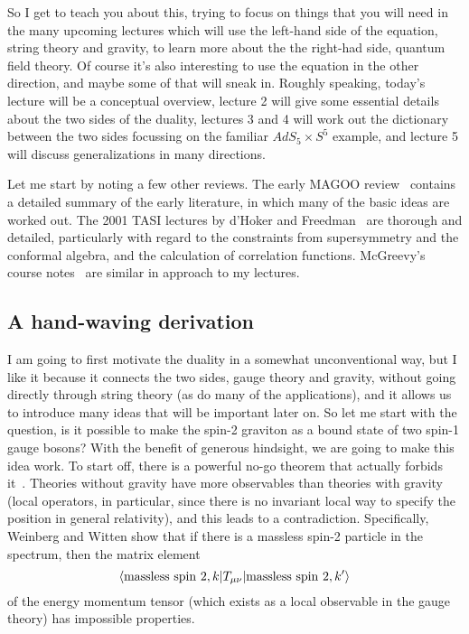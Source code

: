 \documentclass[12pt]{article}
\begin{document}
So I get to teach you about this, trying to focus on things that you will need in the many upcoming lectures which will use the left-hand side of the equation, string theory and gravity, to learn more about the the right-had side, quantum field theory.  Of course it's also interesting to use the equation in the other direction, and maybe some of that will sneak in.  Roughly speaking, today's lecture will be a conceptual overview, lecture 2 will give some essential details about the two sides of the duality, lectures 3 and 4 will work out the dictionary between the two sides focussing on the familiar $AdS_5 \times S^5$ example, and lecture 5 will discuss generalizations in many directions.

Let me start by noting a few other reviews.  The early MAGOO review~\cite{Aharony:1999ti} contains a detailed summary of the early literature, in which many of the basic ideas are worked out.  The 2001 TASI lectures by d'Hoker and Freedman~\cite{D'Hoker:2002aw} are thorough and detailed, particularly with regard to the constraints from supersymmetry and the conformal algebra, and the calculation of correlation functions.  McGreevy's course notes~\cite{mcgnotes} are similar in approach to my lectures.

\subsection{A hand-waving derivation}

I am going to first motivate the duality in a somewhat unconventional way, but I like it because it connects the two sides, gauge theory and gravity, without going directly through string theory (as do many of the applications), and it allows us to introduce many ideas that will be important later on.  So let me start with the question, is it possible to make the spin-2 graviton as a bound state of two spin-1 gauge bosons?  With the benefit of generous hindsight, we are going to make this idea work.  To start off, there is a powerful no-go theorem that actually forbids it~\cite{Weinberg:1980kq}.  Theories without gravity have more observables than theories with gravity (local operators, in particular, since there is no invariant local way to specify the position in general relativity), and this leads to a contradiction.  Specifically, Weinberg and Witten show that if there is a massless spin-2 particle in the spectrum, then the matrix element
\begin{equation}
\langle {\rm massless\ spin\ 2}, k | T_{\mu\nu} |  {\rm massless\ spin\ 2}, k' \rangle 
\end{equation}
 of the energy momentum tensor (which exists as a local observable in the gauge theory) has impossible properties.
\end{document}
